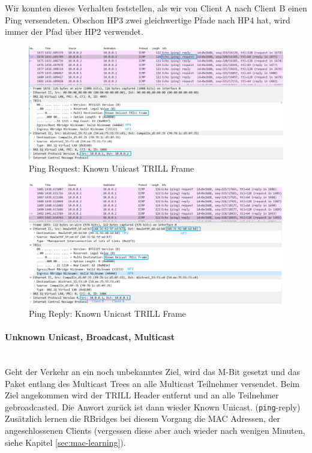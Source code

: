  Wir konnten dieses Verhalten feststellen, als wir von Client A nach Client B einen Ping versendeten. Obschon HP3 zwei gleichwertige Pfade nach HP4 hat, wird immer der Pfad über HP2 verwendet.

\begin{figure}[H]
	\centering
	\includegraphics[width=\linewidth]{images/ping_request}
	\caption{Ping Request: Known Unicast TRILL Frame}
	\label{fig:trillpackage}
\end{figure}


\begin{figure}[H]
	\centering
	\includegraphics[width=\linewidth]{images/ping_reply}
	\caption{Ping Reply: Known Unicast TRILL Frame}
	\label{fig:trillpackage}
\end{figure}

\paragraph{Unknown Unicast, Broadcast, Multicast} \hfill \\
Geht der Verkehr an ein noch unbekanntes Ziel, wird das M-Bit gesetzt und das Paket entlang des Multicast Trees an alle Multicast Teilnehmer versendet. Beim Ziel angekommen wird der TRILL Header entfernt und an alle Teilnehmer gebroadcasted. Die Anwort zurück ist dann wieder Known Unicast. (\lstinline|ping|-reply) Zusätzlich lernen die RBridges bei diesem Vorgang die MAC Adressen, der angeschlossenen Clients (vergessen diese aber auch wieder nach wenigen Minuten, siehe Kapitel \ref{sec:mac-learning}).

